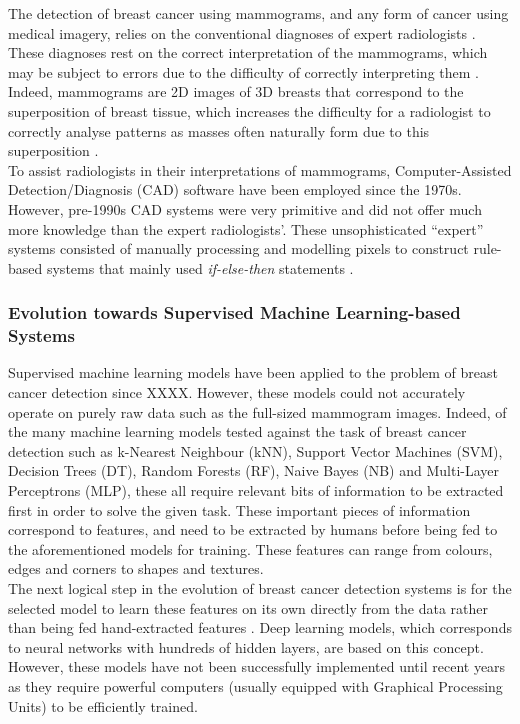 \documentclass[letterpaper,12pt]{article}
\begin{document}

The detection of breast cancer using mammograms, and any form of cancer using medical imagery, relies on the conventional diagnoses of expert radiologists \cite{Osareh2010}. These diagnoses rest on the correct interpretation of the mammograms, which may be subject to errors due to the difficulty of correctly interpreting them \cite{Elter2009}. Indeed, mammograms are 2D images of 3D breasts that correspond to the superposition of breast tissue, which increases the difficulty for a radiologist to correctly analyse patterns as masses often naturally form due to this superposition \cite{Elter2009}.\\

To assist radiologists in their interpretations of mammograms, Computer-Assisted Detection/Diagnosis (CAD) software have been employed since the 1970s. However, pre-1990s CAD systems were very primitive and did not offer much more knowledge than the expert radiologists'. These unsophisticated ``expert'' systems consisted of manually processing and modelling pixels to construct rule-based systems that mainly used \textit{if-else-then} statements \cite{Litjens2017}.

\subsubsection{Evolution towards Supervised Machine Learning-based Systems}

Supervised machine learning models have been applied to the problem of breast cancer detection since XXXX. However, these models could not accurately operate on purely raw data such as the full-sized mammogram images. Indeed, of the many machine learning models tested against the task of breast cancer detection such as k-Nearest Neighbour (kNN), Support Vector Machines (SVM), Decision Trees (DT), Random Forests (RF), Naive Bayes (NB) and Multi-Layer Perceptrons (MLP), these all require relevant bits of information to be extracted first in order to solve the given task. These important pieces of information correspond to features, and need to be extracted by humans before being fed to the aforementioned models for training. These features can range from colours, edges and corners to shapes and textures.\\

The next logical step in the evolution of breast cancer detection systems is for the selected model to learn these features on its own directly from the data rather than being fed hand-extracted features \cite{Yala2019}. Deep learning models, which corresponds to neural networks with hundreds of hidden layers, are based on this concept. However, these models have not been successfully implemented until recent years as they require powerful computers (usually equipped with Graphical Processing Units) to be efficiently trained. 
\end{document}
